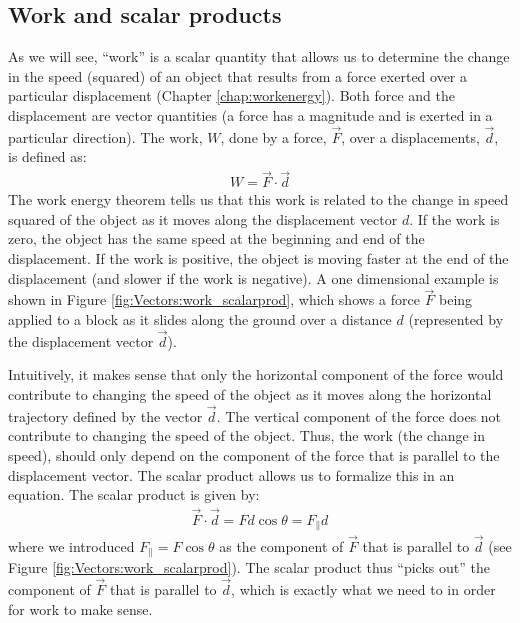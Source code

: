 \subsection{Work and scalar products}
As we will see, ``work'' is a scalar quantity that allows us to determine the change in the speed (squared) of an object that results from a force exerted over a particular displacement (Chapter \ref{chap:workenergy}). Both force and the displacement are vector quantities (a force has a magnitude and is exerted in a particular direction). The work, $W$, done by a force, $\vec F$, over a displacements, $\vec d$, is defined as:
\begin{align*}
W = \vec F \cdot \vec d
\end{align*}
The work energy theorem tells us that this work is related to the change in speed squared of the object as it moves along the displacement vector $d$. If the work is zero, the object has the same speed at the beginning and end of the displacement. If the work is positive, the object is moving faster at the end of the displacement (and slower if the work is negative). A one dimensional example is shown in Figure \ref{fig:Vectors:work_scalarprod}, which shows a force $\vec F$ being applied to a block as it slides along the ground over a distance $d$ (represented by the displacement vector $\vec d$).  


Intuitively, it makes sense that only the horizontal component of the force would contribute to changing the speed of the object as it moves along the horizontal trajectory defined by the vector $\vec d$. The vertical component of the force does not contribute to changing the speed of the object. Thus, the work (the change in speed), should only depend on the component of the force that is parallel to the displacement vector. The scalar product allows us to formalize this in an equation. The scalar product is given by:
\begin{align*}
\vec F \cdot \vec d = Fd\cos\theta = F_{\parallel}d
\end{align*}
where we introduced $F_{\parallel} = F\cos\theta$ as the component of $\vec F$ that is parallel to $\vec d$ (see Figure \ref{fig:Vectors:work_scalarprod}). The scalar product thus ``picks out'' the component of $\vec F$ that is parallel to $\vec d$, which is exactly what we need to in order for work to make sense.

